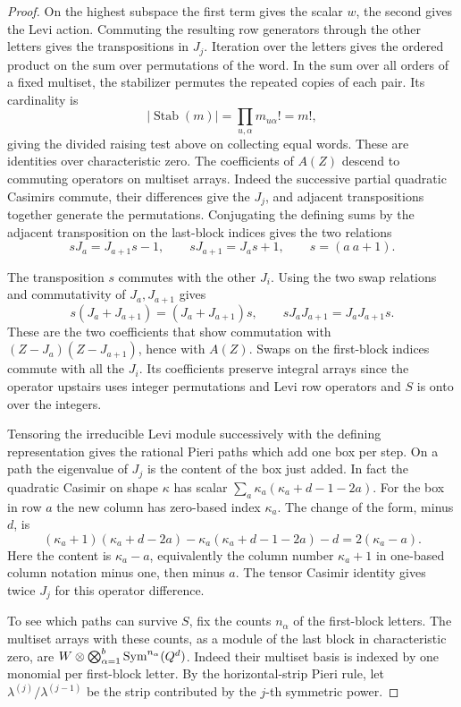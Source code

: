 \begin{proof}
On the highest subspace the first term gives the scalar
\(w\), the second gives the Levi action. Commuting the
resulting row generators through the other letters gives
the transpositions in \(J_j\). Iteration over the letters
gives the ordered product on the sum over permutations of
the word. In the sum over all orders of a fixed multiset, the stabilizer permutes the repeated copies of each pair. Its cardinality is
\[
 |\operatorname{Stab}(m)|=\prod_{u,\alpha}m_{u\alpha}!=m!,
\]
giving the divided raising test above on collecting equal words.
These are identities over characteristic zero. The
coefficients of \(A(Z)\) descend to commuting operators on
multiset arrays. Indeed the successive partial quadratic
Casimirs commute, their differences give the \(J_j\), and
adjacent transpositions together generate the permutations.
Conjugating the defining sums by the adjacent transposition on the last-block indices gives the two relations
\[
 sJ_a=J_{a+1}s-1,\qquad sJ_{a+1}=J_as+1,\qquad s=(a\ a+1).
\]

The transposition \(s\) commutes with the other \(J_i\).
Using the two swap relations and commutativity of \(J_a,J_{a+1}\)
gives
\[
        s(J_a+J_{a+1})=(J_a+J_{a+1})s,\qquad
        sJ_aJ_{a+1}=J_aJ_{a+1}s .
\]
These are the two coefficients that show commutation with
\((Z-J_a)(Z-J_{a+1})\), hence with \(A(Z)\). Swaps on the
first-block indices commute with all the \(J_i\). Its coefficients preserve integral
arrays since the operator upstairs uses integer permutations
and Levi row operators and \(S\) is onto over the integers.

Tensoring the irreducible Levi module successively with
the defining representation gives the rational Pieri paths
which add one box per step. On a path the eigenvalue of
\(J_j\) is the content of the box just added. In fact the
quadratic Casimir on shape \(\kappa\) has scalar
\(\sum_a \kappa_a(\kappa_a+d-1-2a)\). For the box in row \(a\) the new column has zero-based index \(\kappa_a\).
The change of the form, minus \(d\), is
\[
 (\kappa_a+1)(\kappa_a+d-2a)
       -\kappa_a(\kappa_a+d-1-2a)-d=2(\kappa_a-a).
\]
Here the content is \(\kappa_a-a\), equivalently the
column number \(\kappa_a+1\) in one-based column notation
minus one, then minus \(a\). The tensor Casimir identity gives twice \(J_j\)
for this operator difference.

To see which paths can survive
\(S\), fix the counts \(n_\alpha\) of the first-block letters.
The multiset arrays with these counts, as a module of the
last block in characteristic zero, are
\(W\otimes\bigotimes_{\alpha=1}^b
\operatorname{Sym}^{n_\alpha}(Q^d)\).
Indeed their multiset basis is indexed by one monomial per
first-block letter. By the horizontal-strip Pieri rule, let \(\lambda^{(j)}/\lambda^{(j-1)}\) be the strip contributed by the \(j\)-th symmetric power.


\end{proof}
